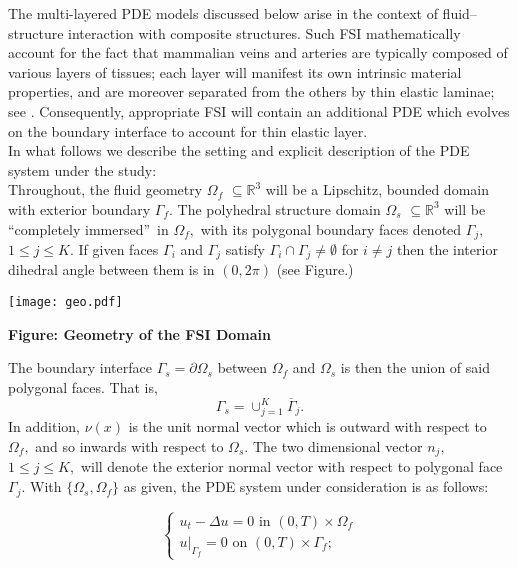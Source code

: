 \documentclass[11pt]{article}
\begin{document}
The multi-layered PDE models discussed below arise in the context of fluid–structure interaction with composite structures. Such FSI mathematically account for the fact that mammalian veins and arteries are typically composed of various layers of tissues; each layer will manifest its own intrinsic material properties, and are moreover separated from the others by thin elastic laminae; see \cite{multi-layered}. Consequently, appropriate FSI will contain an additional PDE which evolves on the boundary interface to account for thin elastic layer. \\

\noindent In what follows we describe the setting and explicit description of the PDE system under the study: \\


\noindent Throughout, the fluid geometry $\Omega _{f}$ $\subseteq \mathbb{R}^{3}$ will be a
Lipschitz, bounded domain with exterior boundary $\Gamma _{f}$. The
polyhedral structure domain $\Omega _{s}$ $\subseteq \mathbb{R}^{3}$ will be
\textquotedblleft completely immersed\textquotedblright\ in $\Omega _{f},$
with its polygonal boundary faces denoted $\Gamma _{j},$ $1\leq j\leq K$. If given faces 
$\Gamma _{i}$ and $\Gamma _{j}$ satisfy $\Gamma _{i}\cap \Gamma _{j}\neq
\emptyset $ for $i\neq j$ then the interior dihedral angle between them is
in $(0,2\pi )$ (see Figure.)

\begin{center}
\texttt{[image: geo.pdf]} 

\textbf{Figure: Geometry of the FSI Domain} 
\end{center}
The boundary interface $\Gamma _{s}=\partial \Omega _{s}$ between $\Omega
_{f}$ and $\Omega _{s}$ is then the union of said polygonal faces. That is, 
\[
\Gamma _{s}=\cup _{j=1}^{K}\overline{\Gamma }_{j}.
\]
In addition, $\nu (x)$ is the unit normal vector which is outward with
respect to $\Omega _{f},$ and so inwards with respect to $\Omega _{s}.$ The
two dimensional vector $n_{j},$ $1\leq j\leq K,$ will denote the exterior
normal vector with respect to polygonal face $\Gamma _{j}.$ With $\{\Omega
_{s},\Omega _{f}\}$ as given, the PDE system under consideration is as
follows:

\begin{equation}
\left\{ 
\begin{array}{l}
u_{t}-\Delta u=0\text{ \ \ \ in \ }(0,T)\times \Omega _{f} \\ 
u|_{\Gamma _{f}}=0\text{ \ \ \ on \ }(0,T)\times \Gamma _{f};%
\end{array}%
\right.   \label{2a}
\end{equation}
\end{document}
